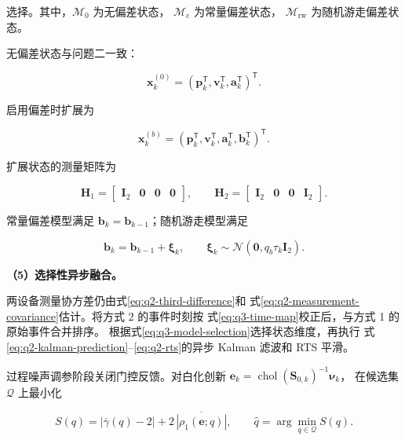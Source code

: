 选择。其中，\(\mathcal M_0\) 为无偏差状态，
\(\mathcal M_{\mathrm c}\) 为常量偏差状态，
\(\mathcal M_{\mathrm{rw}}\) 为随机游走偏差状态。

无偏差状态与问题二一致：

\begin{equation}
\mathbf x_k^{(0)}
=\left(
\mathbf p_k^\mathsf T,
\mathbf v_k^\mathsf T,
\mathbf a_k^\mathsf T
\right)^\mathsf T.
\label{eq:q3-state-no-bias}
\end{equation}

启用偏差时扩展为

\begin{equation}
\mathbf x_k^{(b)}
=\left(
\mathbf p_k^\mathsf T,
\mathbf v_k^\mathsf T,
\mathbf a_k^\mathsf T,
\mathbf b_k^\mathsf T
\right)^\mathsf T.
\label{eq:q3-state-with-bias}
\end{equation}

扩展状态的测量矩阵为

\begin{equation}
\mathbf H_1=
\begin{bmatrix}
\mathbf I_2&\mathbf 0&\mathbf 0&\mathbf 0
\end{bmatrix},
\qquad
\mathbf H_2=
\begin{bmatrix}
\mathbf I_2&\mathbf 0&\mathbf 0&\mathbf I_2
\end{bmatrix}.
\label{eq:q3-bias-observation-matrix}
\end{equation}

常量偏差模型满足
\(\mathbf b_k=\mathbf b_{k-1}\)；随机游走模型满足

\begin{equation}
\mathbf b_k=\mathbf b_{k-1}+\boldsymbol\xi_k,
\qquad
\boldsymbol\xi_k\sim
\mathcal N(\mathbf 0,q_b\tau_k\mathbf I_2).
\label{eq:q3-bias-random-walk}
\end{equation}

\noindent\textbf{（5）选择性异步融合。}

两设备测量协方差仍由式\eqref{eq:q2-third-difference}和
式\eqref{eq:q2-measurement-covariance}估计。将方式 2 的事件时刻按
式\eqref{eq:q3-time-map}校正后，与方式 1 的原始事件合并排序。
根据式\eqref{eq:q3-model-selection}选择状态维度，再执行
式\eqref{eq:q2-kalman-prediction}--\eqref{eq:q2-rts}的异步 Kalman
滤波和 RTS 平滑。

过程噪声调参阶段关闭门控反馈。对白化创新
\(\mathbf e_k=\operatorname{chol}(\mathbf S_{0,k})^{-1}\boldsymbol\nu_k\)，
在候选集 \(\mathcal Q\) 上最小化

\begin{equation}
S(q)=
\left|\overline{\gamma}(q)-2\right|
+2\,\overline{\left|\rho_1(\mathbf e;q)\right|},
\qquad
\widehat q=\arg\min_{q\in\mathcal Q}S(q).
\label{eq:q3-process-score}
\end{equation}

